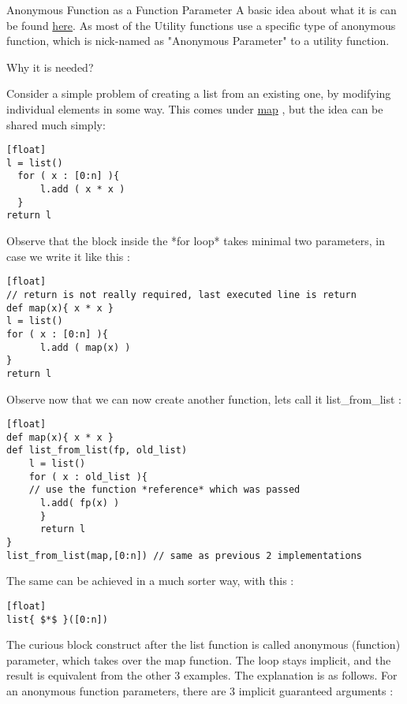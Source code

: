 \begin{section}{Anonymous Function as a Function Parameter}
A basic idea about what it is can be found \href{https://en.wikipedia.org/wiki/Anonymous\_function}{here}.
As most of the Utility functions use a specific type of anonymous function, 
which is nick-named as "Anonymous Parameter" to a utility function.

\begin{subsection}{Why it is needed?}

Consider a simple problem of creating a list from an existing one, 
by modifying individual elements in some way. This comes under 
\href{https://en.wikipedia.org/wiki/Map\_(higher-order\_function)}{map} , but the idea can be shared much simply:

\begin{lstlisting}[style=JexlStyle][float]
l = list()
  for ( x : [0:n] ){
      l.add ( x * x ) 
  }
return l 
\end{lstlisting}
Observe that the block inside the *for loop* takes minimal two parameters, 
in case we write it like this :
\begin{lstlisting}[style=JexlStyle][float]
// return is not really required, last executed line is return 
def map(x){ x * x } 
l = list()
for ( x : [0:n] ){
      l.add ( map(x) ) 
}
return l 
\end{lstlisting}

Observe now that we can now create another function, lets call it list\_from\_list :

\begin{lstlisting}[style=JexlStyle][float]
def map(x){ x * x } 
def list_from_list(fp, old_list)
    l = list()
    for ( x : old_list ){
    // use the function *reference* which was passed
      l.add( fp(x) )   
      }
      return l
} 
list_from_list(map,[0:n]) // same as previous 2 implementations
\end{lstlisting}
The same can be achieved in a much sorter way, with this :
\begin{lstlisting}[style=JexlStyle][float]
list{ $*$ }([0:n])
\end{lstlisting}

The curious block construct after the list function is called anonymous (function) parameter, 
which takes over the map function. The loop stays implicit, and the result is equivalent 
from the other 3 examples. The explanation is as follows.
For an anonymous function parameters, there are 3 implicit guaranteed arguments :


\end{subsection}
\end{section}

